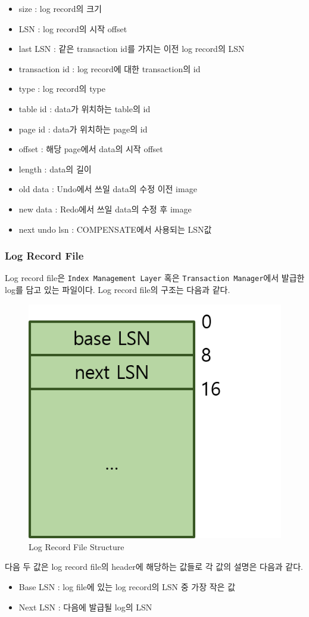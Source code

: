 \documentclass[main.tex]{subfiles}
\begin{document}
\begin{itemize}
	\item size : log record의 크기
	\item LSN : log record의 시작 offset
	\item last LSN : 같은 transaction id를 가지는 이전 log record의 LSN
	\item transaction id : log record에 대한 transaction의 id
	\item type : log record의 type
	\item table id : data가 위치하는 table의 id
	\item page id : data가 위치하는 page의 id
	\item offset : 해당 page에서 data의 시작 offset
	\item length : data의 길이
	\item old data : Undo에서 쓰일 data의 수정 이전 image
	\item new data : Redo에서 쓰일 data의 수정 후 image
	\item next undo lsn : COMPENSATE에서 사용되는 LSN값
\end{itemize}


\newpage
\subsubsection{Log Record File}
Log record file은 \texttt{Index Management Layer} 혹은 \texttt{Transaction Manager}에서 발급한 log를 담고 있는 파일이다. Log record file의 구조는 다음과 같다.

\begin{figure}[!hbt]
	\centering
	\hspace{70px}\includegraphics[width=.4\textwidth]{images/recovery/log_record_file.png}
	\caption{Log Record File Structure}
\end{figure}

다음 두 값은 log record file의 header에 해당하는 값들로 각 값의 설명은 다음과 같다.

\begin{itemize}
	\item Base LSN : log file에 있는 log record의 LSN 중 가장 작은 값
	\item Next LSN : 다음에 발급될 log의 LSN
\end{itemize}
\end{document}
